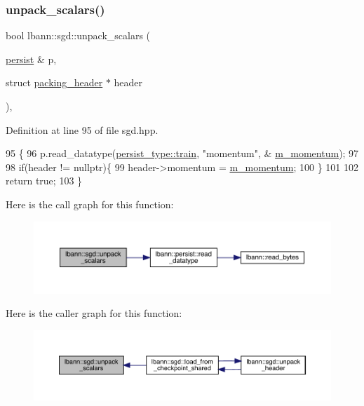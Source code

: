 \subsubsection{\texorpdfstring{unpack\+\_\+scalars()}{unpack\_scalars()}}
{\footnotesize\ttfamily bool lbann\+::sgd\+::unpack\+\_\+scalars (\begin{DoxyParamCaption}\item[{\hyperlink{classlbann_1_1persist}{persist} \&}]{p,  }\item[{struct \hyperlink{structlbann_1_1sgd_1_1packing__header}{packing\+\_\+header} $\ast$}]{header }\end{DoxyParamCaption})\hspace{0.3cm}{\ttfamily [inline]}, {\ttfamily [private]}}



Definition at line 95 of file sgd.\+hpp.


\begin{DoxyCode}
95                                                                 \{
96     p.read\_datatype(\hyperlink{namespacelbann_adee41f31f15f3906cbdcce4a1417eb56a61b3a8faa9c1091806675c230a9abe64}{persist\_type::train}, \textcolor{stringliteral}{"momentum"},  &
      \hyperlink{classlbann_1_1sgd_a2e56d66d350debcf0d2c3ad76c214074}{m\_momentum});
97     
98     \textcolor{keywordflow}{if}(header != \textcolor{keyword}{nullptr})\{
99       header->momentum = \hyperlink{classlbann_1_1sgd_a2e56d66d350debcf0d2c3ad76c214074}{m\_momentum};
100     \}
101    
102   \textcolor{keywordflow}{return} \textcolor{keyword}{true};
103   \}
\end{DoxyCode}
Here is the call graph for this function\+:\nopagebreak
\begin{figure}[H]
\begin{center}
\leavevmode
\includegraphics[width=350pt]{classlbann_1_1sgd_a2b4a91cbb155ed94a185db79fdbf6284_cgraph}
\end{center}
\end{figure}
Here is the caller graph for this function\+:\nopagebreak
\begin{figure}[H]
\begin{center}
\leavevmode
\includegraphics[width=350pt]{classlbann_1_1sgd_a2b4a91cbb155ed94a185db79fdbf6284_icgraph}
\end{center}
\end{figure}



